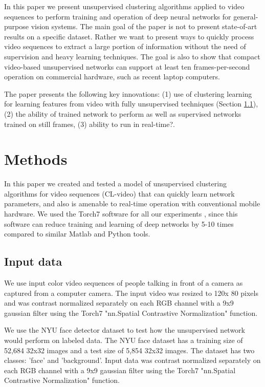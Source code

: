 \documentclass{article} %
\begin{document}
In this paper we present unsupervised clustering algorithms applied to video sequences to perform training and operation of deep neural networks for general-purpose vision systems. 
The main goal of the paper is not to present state-of-art results on a specific dataset. Rather we want to present ways to quickly process video sequences to extract a large portion of information without the need of supervision and heavy learning techniques.
The goal is also to show that compact video-based unsupervised networks can support at least ten frames-per-second operation on commercial hardware, such as recent laptop computers.

The paper presents the following key innovations: (1) use of clustering learning for learning features from video with fully unsupervised techniques (Section \ref{}), (2) the ability of trained network to perform as well as supervised networks trained on still frames, (3) ability to run in real-time?. 



\section{Methods}
\label{sec-methods}

In this paper we created and tested a model of unsupervised clustering algorithms for video sequences (CL-video) that can quickly learn network parameters, and also is amenable to real-time operation with conventional mobile hardware.
We used the Torch7 software for all our experiments \cite{collobert_torch7_2011}, since this software can reduce training and learning of deep networks by 5-10 times compared to similar Matlab and Python tools.


\subsection{Input data}

We use input color video sequences of people talking in front of a camera as captured from a computer camera. The input video was resized to 120x 80 pixels and was contrast normalized separately on each RGB channel with a 9x9 gaussian filter using the Torch7 "nn.Spatial Contrastive Normalization" function.

We use the NYU face detector dataset to test how the unsupervised network would perform on labeled data. The NYU face dataset has a training size of 52,684 32x32 images and a test size of 5,854 32x32 images. The dataset has two classes: 'face' and 'background'. Input data was contrast normalized separately on each RGB channel with a 9x9 gaussian filter using the Torch7 "nn.Spatial Contrastive Normalization" function.
\end{document}
